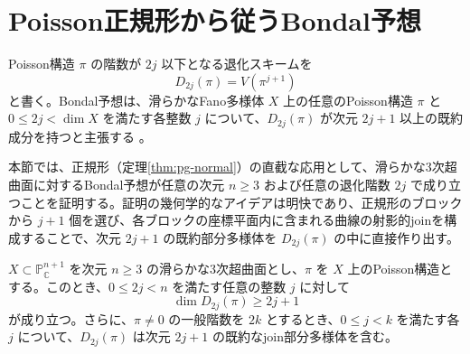 \section{Poisson正規形から従うBondal予想}
\label{sec:pg-bondal}

Poisson構造 $\pi$ の階数が $2j$ 以下となる退化スキームを
\begin{equation}
  D_{2j}(\pi)=V(\pi^{j+1})
\end{equation}
と書く。Bondal予想は、滑らかなFano多様体 $X$ 上の任意のPoisson構造 $\pi$ と $0\le 2j<\dim X$ を満たす各整数 $j$ について、$D_{2j}(\pi)$ が次元 $2j+1$ 以上の既約成分を持つと主張する \cite[Conjecture~1.1]{BondalGualtieriPym}。

本節では、正規形（定理\ref{thm:pg-normal}）の直截な応用として、滑らかな3次超曲面に対するBondal予想が任意の次元 $n\ge3$ および任意の退化階数 $2j$ で成り立つことを証明する。証明の幾何学的なアイデアは明快であり、正規形のブロックから $j+1$ 個を選び、各ブロックの座標平面内に含まれる曲線の射影的joinを構成することで、次元 $2j+1$ の既約部分多様体を $D_{2j}(\pi)$ の中に直接作り出す。

\begin{theorem}
\label{thm:pg-bondal}
$X\subset\mathbb P^{n+1}_{\mathbb C}$ を次元 $n\ge3$ の滑らかな3次超曲面とし、$\pi$ を $X$ 上のPoisson構造とする。このとき、$0\le2j<n$ を満たす任意の整数 $j$ に対して
\begin{equation}
  \dim D_{2j}(\pi)\ge2j+1
\end{equation}
が成り立つ。さらに、$\pi\ne0$ の一般階数を $2k$ とするとき、$0\le j<k$ を満たす各 $j$ について、$D_{2j}(\pi)$ は次元 $2j+1$ の既約なjoin部分多様体を含む。
\end{theorem}

